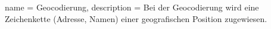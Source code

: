  {
name = Geocodierung,
description = {Bei der Geocodierung wird eine Zeichenkette (Adresse, Namen) einer geografischen Position zugewiesen.}
}
